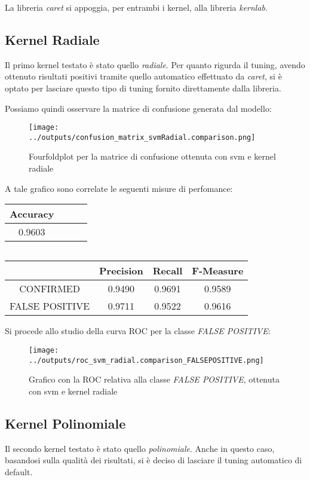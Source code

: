 La libreria \textit{caret} si appoggia, per entrambi i kernel, alla libreria 
\textit{kernlab}.

\subsection{Kernel Radiale}
Il primo kernel testato è stato quello \textit{radiale}.
Per quanto rigurda il tuning, avendo ottenuto risultati positivi tramite quello automatico
effettuato da \textit{caret}, si è optato per lasciare questo tipo di tuning fornito 
direttamente dalla libreria.

Possiamo quindi osservare la matrice di confusione generata dal modello:
\begin{figure}[H]
    \centering
    \texttt{[image: ../outputs/confusion\_matrix\_svmRadial.comparison.png]}
    \caption{Fourfoldplot per la matrice di confusione ottenuta con svm e kernel radiale}
\end{figure}
A tale grafico sono correlate le seguenti misure di perfomance:
\begin{center}
    \begin{tabular}{| c | c c c |} 
    \hline
    Accuracy \\ [0.5ex] 
    \hline\hline
    0.9603 \\ 
    \hline
    \end{tabular}
    $\qquad$
    \begin{tabular}{| c | c c c |} 
    \hline
    & Precision & Recall & F-Measure \\ [0.5ex] 
    \hline\hline
    CONFIRMED & 0.9490 & 0.9691 & 0.9589 \\ 
    \hline
    FALSE POSITIVE & 0.9711 & 0.9522 & 0.9616 \\ 
    \hline
    \end{tabular}
\end{center}
Si procede allo studio della curva ROC per la classe \textit{FALSE POSITIVE}:
\begin{figure}[H]
    \centering
    \texttt{[image: ../outputs/roc\_svm\_radial.comparison\_FALSEPOSITIVE.png]}
    \caption{Grafico con la ROC relativa alla classe \textit{FALSE POSITIVE}, ottenuta con svm e kernel radiale}
\end{figure}
\subsection{Kernel Polinomiale}
Il secondo kernel testato è stato quello \textit{polinomiale}.
Anche in questo caso, basandosi sulla qualità dei risultati, si è deciso di
lasciare il tuning automatico di default.

